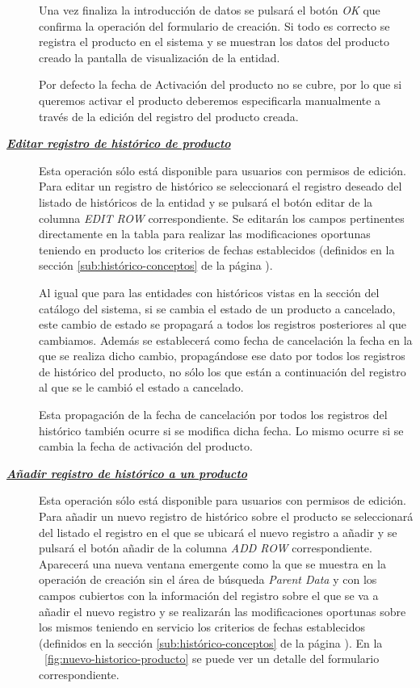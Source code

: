 \begin{description}
Una vez finaliza la introducción de datos se pulsará el botón \emph{OK} que confirma la operación del formulario de creación. Si todo es correcto se registra el producto en el sistema y se muestran los datos del producto creado la pantalla de visualización de la entidad.

Por defecto la fecha de Activación del producto no se cubre, por lo que si queremos activar el producto deberemos especificarla manualmente a través de la edición del registro del producto creada.


\item[\underline{\textsl{\textbf{Editar registro de histórico de producto}}}] Esta operación sólo está disponible para usuarios con permisos de edición.
Para editar un registro de histórico se seleccionará el registro deseado del listado de históricos de la entidad y se pulsará el botón editar de la columna \textit{EDIT ROW} correspondiente. Se editarán los campos pertinentes directamente en la tabla para realizar las modificaciones oportunas teniendo en producto los criterios de fechas establecidos (definidos en la sección \ref{sub:histórico-conceptos} de la página \pageref{sub:histórico-conceptos}).

Al igual que para las entidades con históricos vistas en la sección del catálogo del sistema, si se cambia el estado de un producto a cancelado, este cambio de estado se propagará a todos los registros posteriores al que cambiamos. Además se establecerá como fecha de cancelación la fecha en la que se realiza dicho cambio, propagándose ese dato por todos los registros de histórico del producto, no sólo los que están a continuación del registro al que se le cambió el estado a cancelado.

Esta propagación de la fecha de cancelación por todos los registros del histórico  también ocurre si se modifica dicha fecha. Lo mismo ocurre si se cambia la fecha de activación del producto.

\item[\underline{\textsl{\textbf{Añadir registro de histórico a un producto}}}] Esta operación sólo está disponible para usuarios con permisos de edición.
Para añadir un nuevo registro de histórico sobre el producto se seleccionará del listado el registro en el que se ubicará el nuevo registro a añadir y se pulsará el botón añadir de la columna \textit{ADD ROW} correspondiente. Aparecerá una nueva ventana emergente como la que se muestra en la operación de creación sin el área de búsqueda \emph{Parent Data} y con los campos cubiertos con la información del registro sobre el que se va a añadir el nuevo registro y se realizarán las modificaciones oportunas sobre los mismos teniendo en servicio los criterios de fechas establecidos (definidos en la sección \ref{sub:histórico-conceptos} de la página \pageref{sub:histórico-conceptos}). En la \figurename~\ref{fig:nuevo-historico-producto} se puede ver un detalle del formulario correspondiente.


\end{description}
